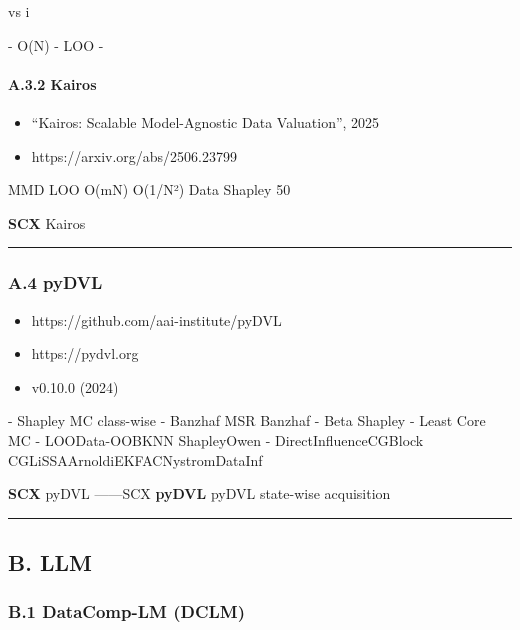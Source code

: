 \documentclass[
  12pt,
]{article}
\providecommand{\tightlist}{%
  \setlength{\itemsep}{0pt}\setlength{\parskip}{0pt}}
\begin{document}
 vs  i 

\textbf{} - O(N)  -  LOO
 - 

\paragraph{A.3.2 Kairos}\label{a.3.2-kairos}

\begin{itemize}
\tightlist
\item
  \textbf{}``Kairos: Scalable Model-Agnostic Data Valuation'',
  2025
\item
  \textbf{}https://arxiv.org/abs/2506.23799
\end{itemize}

\textbf{} MMD  LOO 
O(mN) O(1/N²) Data Shapley  50 

\textbf{SCX }Kairos


\begin{center}\rule{0.5\linewidth}{0.5pt}\end{center}

\subsubsection{A.4 pyDVL }\label{a.4-pydvl-ux751fux6001}

\begin{itemize}
\tightlist
\item
  \textbf{}https://github.com/aai-institute/pyDVL
\item
  \textbf{}https://pydvl.org
\item
  \textbf{}v0.10.0 (2024)
\end{itemize}

\textbf{} - Shapley MC
class-wise - Banzhaf  MSR Banzhaf - Beta
Shapley  - Least Core MC - LOOData-OOBKNN
ShapleyOwen  - DirectInfluenceCGBlock
CGLiSSAArnoldiEKFACNystromDataInf

\textbf{ SCX }pyDVL
------SCX
\textbf{ pyDVL
} pyDVL
 state-wise acquisition

\begin{center}\rule{0.5\linewidth}{0.5pt}\end{center}

\subsection{B. LLM }\label{b.-llm-ux6570ux636eux9009ux62e9}

\subsubsection{B.1 DataComp-LM (DCLM)}\label{b.1-datacomp-lm-dclm}
\end{document}
